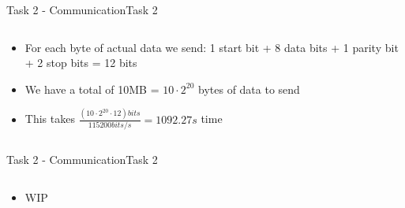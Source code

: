 \begin{frame}[fragile]{Task 2 - Communication}{Task 2}
  \begin{solution}
    \begin{columns}
      \begin{column}{0.8\textwidth}
        \begin{itemize}
          \item For each byte of actual data we send: 1 start bit + 8 data bits + 1 parity bit + 2 stop bits = 12 bits
          \item We have a total of 10MB = $10 \cdot 2^{20}$ bytes of data to send
          \item This takes $\frac{(10 \cdot 2^{20} \cdot 12)bits}{115200bits/s} = 1092.27s$ time
        \end{itemize}
      \end{column}
    \end{columns}
  \end{solution}
\end{frame}

\begin{frame}[fragile]{Task 2 - Communication}{Task 2}
  \begin{solution}
    \begin{columns}
      \begin{column}{0.8\textwidth}
        \begin{itemize}
          \item WIP
        \end{itemize}
      \end{column}
    \end{columns}
  \end{solution}
\end{frame}